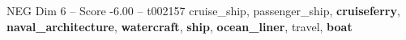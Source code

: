 \begin{textsample}{NEG Dim 6 – Score -6.00 – t002157}  \label{ex:f6_neg_032}
cruise\_ship, passenger\_ship, \textbf{cruiseferry}, \textbf{naval\_architecture}, \textbf{watercraft}, \textbf{ship}, \textbf{ocean\_liner}, travel, \textbf{boat}

\end{textsample}

